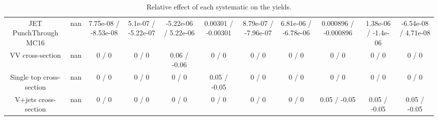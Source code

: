 \begin{table}[htbp]
\begin{center}
\begin{tabular}{|c|c|c|c|c|c|c|c|c|c|c|}
  JET PunchThrough MC16 &    nan    & 7.75e-08 / -8.53e-08 & 5.1e-07 / -5.22e-07 & -5.22e-06 / 5.22e-06 & 0.00301 / -0.00301 & 8.79e-07 / -7.96e-07 & 6.81e-06 / -6.78e-06 & 0.000896 / -0.000896 & 1.38e-06 / -1.4e-06 & -6.54e-08 / 4.71e-08 \\ 
  VV cross-section &    nan    & 0 / 0 & 0 / 0 & 0.06 / -0.06 & 0 / 0 & 0 / 0 & 0 / 0 & 0 / 0 & 0 / 0 & 0 / 0 \\ 
  Single top cross-section &    nan    & 0 / 0 & 0 / 0 & 0 / 0 & 0.05 / -0.05 & 0 / 0 & 0 / 0 & 0 / 0 & 0 / 0 & 0 / 0 \\ 
  V+jets cross-section &    nan    & 0 / 0 & 0 / 0 & 0 / 0 & 0 / 0 & 0 / 0 & 0 / 0 & 0.05 / -0.05 & 0.05 / -0.05 & 0.05 / -0.05 \\ 
\hline 
\end{tabular} 
\caption{Relative effect of each systematic on the yields.} 
\end{center} 
\end{table} 
